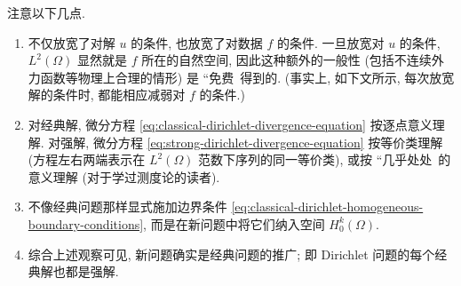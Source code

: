 注意以下几点.\begin{enumerate}\item 不仅放宽了对解 $u$ 的条件, 也放宽了对数据 $f$ 的条件. 一旦放宽对 $u$ 的条件, $L^2(\Omega)$ 显然就是 $f$ 所在的自然空间, 因此这种额外的一般性 (包括不连续外力函数等物理上合理的情形) 是 ``免费\textquotesingle\textquotesingle\ 得到的. (事实上, 如下文所示, 每次放宽解的条件时, 都能相应减弱对 $f$ 的条件.)\item 对经典解, 微分方程 \eqref{eq:classical-dirichlet-divergence-equation} 按逐点意义理解. 对强解, 微分方程 \eqref{eq:strong-dirichlet-divergence-equation} 按等价类理解 (方程左右两端表示在 $L^2(\Omega)$ 范数下序列的同一等价类), 或按 ``几乎处处\textquotesingle\textquotesingle\ 的意义理解 (对于学过测度论的读者).\item 不像经典问题那样显式施加边界条件 \eqref{eq:classical-dirichlet-homogeneous-boundary-conditions}, 而是在新问题中将它们纳入空间 $H_0^k(\Omega)$.\item 综合上述观察可见, 新问题确实是经典问题的推广; 即 Dirichlet 问题的每个经典解也都是强解.\end{enumerate}
